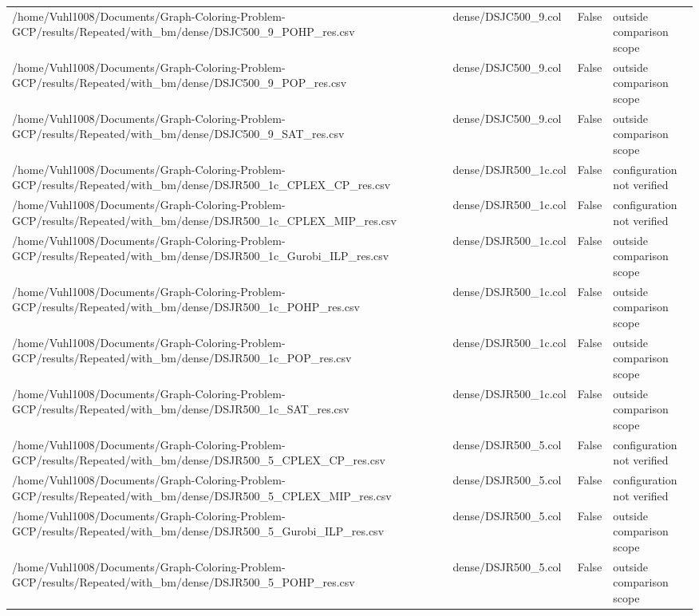 \begin{table}[htbp]
\begin{tabular}{llll}
/home/Vuhl1008/Documents/Graph-Coloring-Problem-GCP/results/Repeated/with\_bm/dense/DSJC500\_9\_POHP\_res.csv & dense/DSJC500\_9.col & False & outside comparison scope \\
/home/Vuhl1008/Documents/Graph-Coloring-Problem-GCP/results/Repeated/with\_bm/dense/DSJC500\_9\_POP\_res.csv & dense/DSJC500\_9.col & False & outside comparison scope \\
/home/Vuhl1008/Documents/Graph-Coloring-Problem-GCP/results/Repeated/with\_bm/dense/DSJC500\_9\_SAT\_res.csv & dense/DSJC500\_9.col & False & outside comparison scope \\
/home/Vuhl1008/Documents/Graph-Coloring-Problem-GCP/results/Repeated/with\_bm/dense/DSJR500\_1c\_CPLEX\_CP\_res.csv & dense/DSJR500\_1c.col & False & configuration not verified \\
/home/Vuhl1008/Documents/Graph-Coloring-Problem-GCP/results/Repeated/with\_bm/dense/DSJR500\_1c\_CPLEX\_MIP\_res.csv & dense/DSJR500\_1c.col & False & configuration not verified \\
/home/Vuhl1008/Documents/Graph-Coloring-Problem-GCP/results/Repeated/with\_bm/dense/DSJR500\_1c\_Gurobi\_ILP\_res.csv & dense/DSJR500\_1c.col & False & outside comparison scope \\
/home/Vuhl1008/Documents/Graph-Coloring-Problem-GCP/results/Repeated/with\_bm/dense/DSJR500\_1c\_POHP\_res.csv & dense/DSJR500\_1c.col & False & outside comparison scope \\
/home/Vuhl1008/Documents/Graph-Coloring-Problem-GCP/results/Repeated/with\_bm/dense/DSJR500\_1c\_POP\_res.csv & dense/DSJR500\_1c.col & False & outside comparison scope \\
/home/Vuhl1008/Documents/Graph-Coloring-Problem-GCP/results/Repeated/with\_bm/dense/DSJR500\_1c\_SAT\_res.csv & dense/DSJR500\_1c.col & False & outside comparison scope \\
/home/Vuhl1008/Documents/Graph-Coloring-Problem-GCP/results/Repeated/with\_bm/dense/DSJR500\_5\_CPLEX\_CP\_res.csv & dense/DSJR500\_5.col & False & configuration not verified \\
/home/Vuhl1008/Documents/Graph-Coloring-Problem-GCP/results/Repeated/with\_bm/dense/DSJR500\_5\_CPLEX\_MIP\_res.csv & dense/DSJR500\_5.col & False & configuration not verified \\
/home/Vuhl1008/Documents/Graph-Coloring-Problem-GCP/results/Repeated/with\_bm/dense/DSJR500\_5\_Gurobi\_ILP\_res.csv & dense/DSJR500\_5.col & False & outside comparison scope \\
/home/Vuhl1008/Documents/Graph-Coloring-Problem-GCP/results/Repeated/with\_bm/dense/DSJR500\_5\_POHP\_res.csv & dense/DSJR500\_5.col & False & outside comparison scope \\

\end{tabular}
\end{table}
